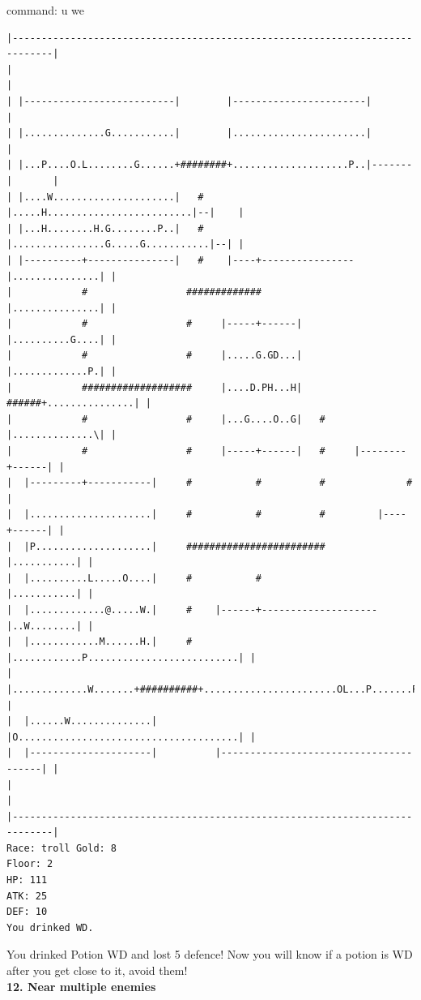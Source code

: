 \documentclass[11pt]{article}
\theoremstyle{plain}
\begin{document}
command: u we
\begin{Verbatim}[fontsize=\scriptsize]
|-----------------------------------------------------------------------------|
|                                                                             |
| |--------------------------|        |-----------------------|               |
| |..............G...........|        |.......................|               |
| |...P....O.L........G......+########+....................P..|-------|       |
| |....W.....................|   #    |.....H.........................|--|    |
| |...H........H.G........P..|   #    |................G.....G...........|--| |
| |----------+---------------|   #    |----+----------------|...............| |
|            #                 #############                |...............| |
|            #                 #     |-----+------|         |..........G....| |
|            #                 #     |.....G.GD...|         |.............P.| |
|            ###################     |....D.PH...H|   ######+...............| |
|            #                 #     |...G....O..G|   #     |..............\| |
|            #                 #     |-----+------|   #     |--------+------| |
|  |---------+-----------|     #           #          #              #        |
|  |.....................|     #           #          #         |----+------| |
|  |P....................|     ########################         |...........| |
|  |..........L.....O....|     #           #                    |...........| |
|  |.............@.....W.|     #    |------+--------------------|..W........| |
|  |............M......H.|     #    |............P..........................| |
|  |.............W.......+##########+.......................OL...P.......P..| |
|  |......W..............|          |O......................................| |
|  |---------------------|          |---------------------------------------| |
|                                                                             |
|-----------------------------------------------------------------------------|
Race: troll Gold: 8                                                    Floor: 2
HP: 111
ATK: 25
DEF: 10
You drinked WD. 
\end{Verbatim}

You drinked Potion WD and lost 5 defence! Now you will know if a potion is WD
after you get close to it, avoid them!\\





\newpage
\textbf{12. Near multiple enemies}
\end{document}
